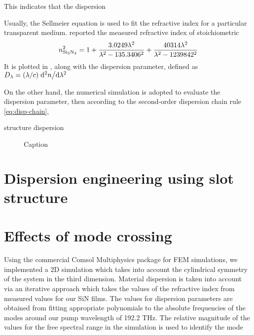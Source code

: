 This indicates that the dispersion 

Usually, the Sellmeier equation is used to fit the refractive index for a particular transparent medium. \citeauthor{Luke2015a} reported the measured refractive index of stoichiometric 
\begin{equation}\label{eq:si3n4-selleimeier}
    n_{\ce{Si3N4}}^2 = 1 + \frac{3.0249 \lambda^2}{\lambda^2-135.3406^2} + \frac{40314 \lambda^2}{\lambda^2 - 1239842^2}
\end{equation}
It is plotted in , along with the dispersion parameter, defined as $D_{\lambda}=(\lambda/c)\dv*[2]{n}{\lambda}$

On the other hand, the numerical simulation is adopted to evaluate the dispersion parameter, then according to the second-order dispersion chain rule \autoref{eq:disp-chain}, 



structure dispersion

\begin{figure}
    \centering
    
    \caption{Caption}
    \label{fig:my_label}
\end{figure}

\section{Dispersion engineering using slot structure}

\section{Effects of mode crossing}


Using the commercial Comsol Multiphysics package for FEM simulations, we implemented a 2D simulation which takes into account the cylindrical symmetry of the system in the third dimension. Material dispersion is taken into account via an iterative approach which takes the values of the refractive index from measured values for our SiN films. The values for dispersion parameters are obtained from fitting appropriate polynomials to the absolute frequencies of the modes around our pump wavelength of 192.2 THz. The relative magnitude of the values for the free spectral range in the simulation is used to identify the mode